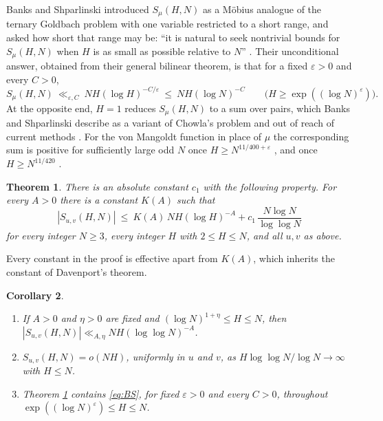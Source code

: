 \documentclass[11pt,a4paper]{article}
\theoremstyle{plain}
\newtheorem{theorem}{Theorem}
\newtheorem{corollary}[theorem]{Corollary}
\theoremstyle{remark}
\newcommand{\eps}{\varepsilon}
\newcommand{\Smu}{S_{\mu}}
\newcommand{\Suv}{S_{u,v}}
\begin{document}
Banks and Shparlinski \cite[(1.3)]{BS} introduced $\Smu(H,N)$ as a M\"obius analogue of the ternary
Goldbach problem with one variable restricted to a short range, and asked how short that range may be:
``it is natural to seek nontrivial bounds for $S_\mu(H,N)$ when $H$ is as small as possible relative
to $N$'' \cite[\S7.6]{BS}. Their unconditional answer, obtained from their general bilinear theorem,
is that for a fixed $\eps>0$ and every $C>0$,
\begin{equation}\label{eq:BS}
  \Smu(H,N)\ \ll_{\eps,C}\ NH(\log H)^{-C/\eps}\ \le\ NH(\log N)^{-C}
  \qquad\bigl(H\ge\exp((\log N)^{\eps})\bigr).
\end{equation}
At the opposite end, $H=1$ reduces $\Smu(H,N)$ to a sum over pairs, which Banks and Shparlinski
describe as a variant of Chowla's problem and out of reach of current methods \cite[\S7.6]{BS}. For
the von Mangoldt function in place of $\mu$ the corresponding sum is positive for sufficiently large
odd $N$ once $H\ge N^{11/400+\eps}$ \cite{Cai}, and once $H\ge N^{11/420}$
\cite[Thm.~7.3]{Li}.

\begin{theorem}\label{thm:main}
There is an absolute constant $c_1$ with the following property. For every $A>0$ there is a constant
$K(A)$ such that
\begin{equation}\label{eq:main}
  |\Suv(H,N)|\ \le\ K(A)\,NH(\log H)^{-A}+c_1\,\frac{N\log N}{\log\log N}
\end{equation}
for every integer $N\ge 3$, every integer $H$ with $2\le H\le N$, and all $u,v$ as above.
\end{theorem}

Every constant in the proof is effective apart from $K(A)$, which inherits the constant of Davenport's
theorem.

\begin{corollary}\label{cor:ranges}
\begin{enumerate}
\item[\textup{(a)}] If $A>0$ and $\eta>0$ are fixed and $(\log N)^{1+\eta}\le H\le N$, then
  $|\Suv(H,N)|\ll_{A,\eta}NH(\log\log N)^{-A}$.
\item[\textup{(b)}] $\Suv(H,N)=o(NH)$, uniformly in $u$ and $v$, as $H\log\log N/\log N\to\infty$
  with $H\le N$.
\item[\textup{(c)}] Theorem \ref{thm:main} contains \eqref{eq:BS}, for fixed $\eps>0$ and every
  $C>0$, throughout $\exp((\log N)^{\eps})\le H\le N$.
\end{enumerate}
\end{corollary}
\end{document}
